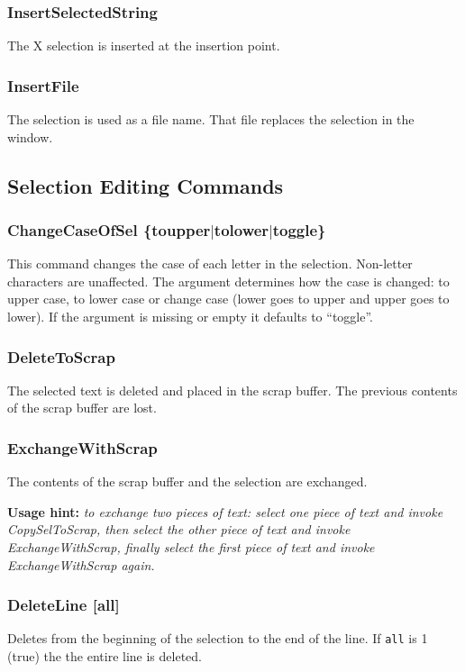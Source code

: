 \subsubsection{InsertSelectedString}
The X selection is inserted at the insertion point.

\subsubsection{InsertFile}
The selection is used as a file name.
That file replaces the selection in the window.




\subsection{ Selection Editing Commands}

\subsubsection{ChangeCaseOfSel \{toupper$\mid$tolower$\mid$toggle\}}
This command changes the case
of each letter in the selection.
Non-letter characters are unaffected.
The argument determines how the case is changed:
to upper case, to lower case or change case
(lower goes to upper and upper goes to lower).
If the argument is missing or empty it defaults to ``toggle''.

\subsubsection{DeleteToScrap}
The selected text is deleted and placed in the scrap buffer.
The previous contents of the scrap buffer are lost.

\subsubsection{ExchangeWithScrap}
The contents of the scrap buffer and the selection are exchanged.

{\bf Usage hint:} {\it to exchange two pieces of text:
select one piece of text
and invoke CopySelToScrap, then select the other piece of text and
invoke ExchangeWithScrap, finally select the first piece of text
and invoke ExchangeWithScrap again.}

\subsubsection{DeleteLine [all]}
Deletes from the beginning of the selection to the end
of the line.
If {\tt all} is 1 (true) the the entire line is deleted.

